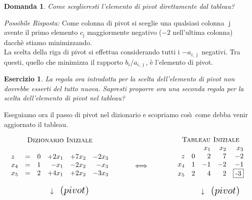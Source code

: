 \documentclass[10pt]{article}
\newtheorem{Dom}{Domanda}%
\newtheorem{Ese}{Esercizio}%
\begin{document}
\begin{Dom}
   Come sceglieresti l'elemento di pivot direttamente dal tableau?
\end{Dom}
{\em Possibile Risposta: \/}
Come colonna di pivot si sceglie
una qualsiasi colonna $\bar{\jmath}$
avente il primo elemento $c_{\bar{\jmath}}$
maggiormente negativo ($-2$ nell'ultima colonna)
dacch\`e stiamo minimizzando.\\

La scelta della riga di pivot si effettua
considerando tutti i $-a_{i,\bar{\jmath}}$ negativi.
Tra questi, quello che minimizza il rapporto $b_i/a_{i,\bar{\jmath}}$,
\`e l'elemento di pivot.\\ 

\begin{Ese}
   La regola ora introdotta per la scelta dell'elemento
   di pivot non dovrebbe esserti del tutto nuova.
   Sapresti proporre ora una seconda regola per
   la scelta dell'elemento di pivot nel tableau?
\end{Ese}

Eseguiamo ora il passo di pivot nel dizionario
e scopriamo cos\`\i\ come debba venir
aggiornato il tableau.

\[
   \begin{array}{c}
   \mbox{\sc Dizionario Iniziale}\\ \\
   \begin{array}{lcrrrr}
         z    &=& 0 & +2x_1 & +7x_2 & -2x_3 \\   
      x_{4} &=& 1 & -x_1 & -2x_2 & -x_3 \\
      x_{5} &=& 2 & +4x_1 & +2x_2 & -3x_3 \\
   \end{array}\\ \\
       \hspace{1cm} {\Huge \downarrow} {\Large \mbox{ \ $(pivot)$}}
   \end{array}
\hfill
\hspace{1cm}
{\Huge \Longleftrightarrow}
\hfill
\hspace{1.2cm}
   \begin{array}{c}
   \mbox{\sc Tableau Iniziale}\\ 
	\begin{array}{rrrrr}
	&	& x_1  & x_2 & x_3  \\
	z  & 0 & 2 &  7   &  -2 \\         
	x_4 &  1 &  -1 &  -2   &  -1 \\
	x_5 & 2 & 4 & 2 &  \fbox{-3} \\
	\end{array}\\ \\
       \hspace{1cm} {\Huge \downarrow} {\Large \mbox{ \ $(pivot)$}}
   \end{array}
\]
\end{document}
